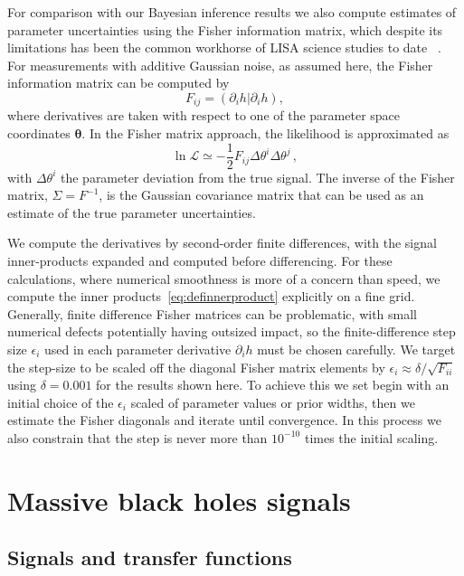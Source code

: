 \documentclass[aps,showpacs,twocolumn,prd,superscriptaddress,nofootinbib]{revtex4-1}
\newcommand{\be}{\begin{equation}}
\newcommand{\ee}{\end{equation}}
\newcommand\calL{{\mathcal{L}}}
\begin{document}
For comparison with our Bayesian inference results we also compute estimates of parameter uncertainties using the Fisher information matrix, which despite its limitations has been the common workhorse of LISA science studies to date ~\cite{Vallisneri08}. For measurements with additive Gaussian noise, as assumed here, the Fisher information matrix can be computed by
\be
	F_{ij} = \left( \partial_{i} h | \partial_{i} h \right),
\ee
where derivatives are taken with respect to one of the parameter space coordinates $\bm{\theta}$. In the Fisher matrix approach, the likelihood is approximated as
\be
	\ln \calL \simeq -\frac{1}{2} F_{ij} \Delta \theta^{i} \Delta \theta^{j} \,,
\ee
with $\Delta \theta^{i}$ the parameter deviation from the true signal. The inverse of the Fisher matrix, $\Sigma = F^{-1}$, is the Gaussian covariance matrix that can be used as an estimate of the true parameter uncertainties.

We compute the derivatives by second-order finite differences, with the signal inner-products expanded and computed before differencing. For these calculations, where numerical smoothness is more of a concern than speed, we compute the inner products~\eqref{eq:definnerproduct} explicitly on a fine grid. Generally, finite difference Fisher matrices can be problematic, with small numerical defects potentially having outsized impact, so the finite-difference step size $\epsilon_i$ used in each parameter derivative $\partial_{i}h$ must be chosen carefully. We target the step-size to be scaled off the diagonal Fisher matrix elements by ${\epsilon_i}\approx\delta/\sqrt{F_{ii}}$ using $\delta=0.001$ for the results shown here.  To achieve this we set begin with an initial choice of the $\epsilon_i$ scaled of parameter values or prior widths, then we estimate the Fisher diagonals and iterate until convergence. In this process we also constrain that the step is never more than $10^{-10}$ times the initial scaling.


\section{Massive black holes signals}
\label{sec:SMBH}


\subsection{Signals and transfer functions}
\label{sec:signaltransfer}
\end{document}
